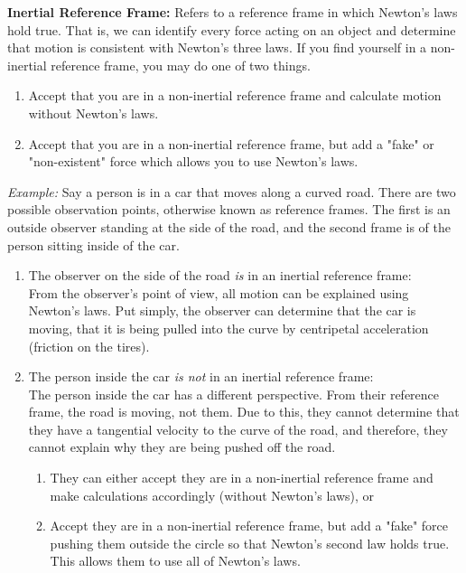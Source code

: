 \noindent \textbf{Inertial Reference Frame:} Refers to a reference frame in which Newton's laws hold true. That is, we can identify every force 
acting on an object and determine that motion is consistent with Newton's three laws. If you find yourself in a non-inertial reference frame, you 
may do one of two things.
\begin{enumerate}
    \item Accept that you are in a non-inertial reference frame and calculate motion without Newton's laws.
    \item Accept that you are in a non-inertial reference frame, but add a "fake" or "non-existent" force which allows you to use Newton's laws.
\end{enumerate}
\textit{Example:} Say a person is in a car that moves along a curved road. There are two possible observation points, otherwise known as reference frames. The first is an outside observer standing at the side of the road, and the second frame is of the person sitting inside of the car.
\begin{enumerate}
    \item The observer on the side of the road \textit{is} in an inertial reference frame: \\
    From the observer's point of view, all motion can be explained using Newton's laws. Put simply, the observer can determine that the car is moving, that it is being pulled into the curve by centripetal acceleration (friction on the tires).
    \item The person inside the car \textit{is not} in an inertial reference frame: \\
    The person inside the car has a different perspective. From their reference frame, the road is moving, not them. Due to this, they cannot determine that they have a tangential velocity to the curve of the road, and therefore, they cannot explain why they are being pushed off the road.
    \begin{enumerate}
        \item They can either accept they are in a non-inertial reference frame and make calculations accordingly (without Newton's laws), or
        \item Accept they are in a non-inertial reference frame, but add a "fake" force pushing them outside the circle so that Newton's second law holds true. This allows them to use all of Newton's laws.
    \end{enumerate}
\end{enumerate}

